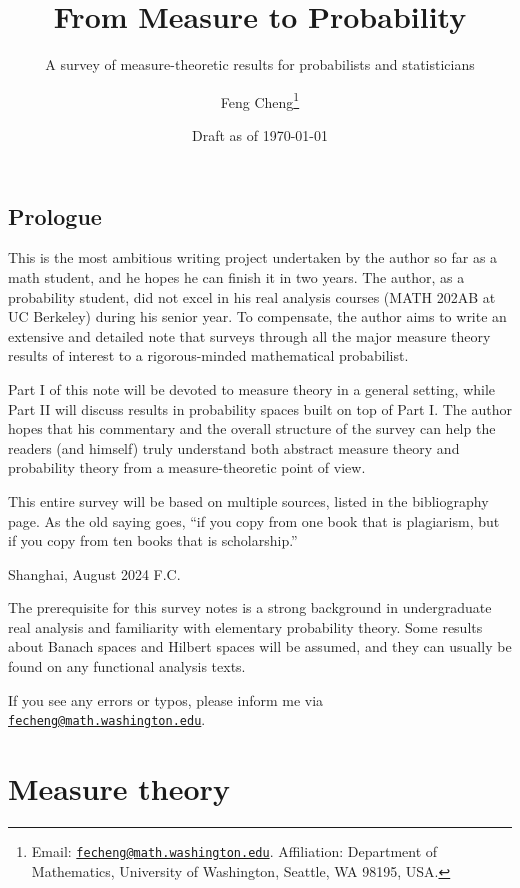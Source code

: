 \documentclass[10pt]{book}
\title{From Measure to Probability}
\subtitle{A survey of measure-theoretic results for probabilists and statisticians}
\author{Feng Cheng\thanks{Email: \href{mailto:fecheng@uw.edu}{\texttt{fecheng@math.washington.edu}}. Affiliation: Department of Mathematics, University of Washington, Seattle, WA 98195, USA.}}
\date{Draft as of \today}
\makeatletter
\numberwithin{equation}{chapter}
\theoremstyle{plain-star}
\theoremstyle{definition-star}
\theoremstyle{remark-star}
\theoremstyle{plain-star}
\let\@subtitle\@empty %
\renewcommand{\maketitle}{%
    \begin{titlepage}
    \renewcommand\thefootnote{\@fnsymbol\c@footnote}
    \let\footnotesize\small
    \let\footnoterule\relax
    \let \footnote \thanks
    \null\vfil
    \vskip 60\p@
    \begin{center}%
        {\LARGE \@title \par}%
        \vskip .5em%
        {\large \@subtitle \par}%
        \vskip 3em%
        {\large
        \lineskip .75em%
        \begin{tabular}[t]{c}%
            \@author
        \end{tabular}\par}%
        \vskip .75em%
        {\large \@date \par}%
    \end{center}\par
    \@thanks
    \vfil\null
    \end{titlepage}%
    \setcounter{footnote}{0}%
    \global\let\thanks\relax
    \global\let\maketitle\relax
    \global\let\@thanks\@empty
    \global\let\@author\@empty
    \global\let\@date\@empty
    \global\let\@title\@empty
    \global\let\title\relax
    \global\let\author\relax
    \global\let\date\relax
    \global\let\and\relax
}
\makeatother
\begin{document}
\maketitle

\tableofcontents
\newpage

{}
\chapter*{\Large Prologue}

This is the most ambitious writing project undertaken by the author so far as a math student, and he hopes he can finish it in two years. The author, as a probability student, did not excel in his real analysis courses (MATH 202AB at UC Berkeley) during his senior year. To compensate, the author aims to write an extensive and detailed note that surveys through all the major measure theory results of interest to a rigorous-minded mathematical probabilist.

Part I of this note will be devoted to measure theory in a general setting, while Part II will discuss results in probability spaces built on top of Part I. The author hopes that his commentary and the overall structure of the survey can help the readers (and himself) truly understand both abstract measure theory and probability theory from a measure-theoretic point of view.

This entire survey will be based on multiple sources, listed in the bibliography page. As the old saying goes, ``if you copy from one book that is plagiarism, but if you copy from ten books that is scholarship.''
\vspace{1\baselineskip}

\noindent Shanghai, August 2024 \hfill F.C.

\vspace{3\baselineskip}
The prerequisite for this survey notes is a strong background in undergraduate real analysis and familiarity with elementary probability theory. Some results about Banach spaces and Hilbert spaces will be assumed, and they can usually be found on any functional analysis texts.

If you see any errors or typos, please inform me via \href{mailto:fecheng@uw.edu}{\texttt{fecheng@math.washington.edu}}.
\newpage

\part{Measure theory}
\end{document}
